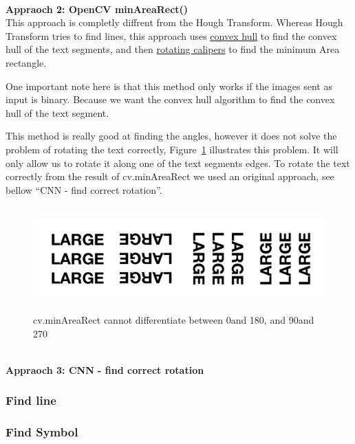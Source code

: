 \documentclass[11pt,a4paper,UKenglish]{article}
\begin{document}
\noindent \\ \textbf{Appraoch 2: OpenCV minAreaRect()}
\noindent \\ This approach is completly diffrent from the Hough Transform.
Whereas Hough Transform tries to find lines, this approach uses
\href{https://en.wikipedia.org/wiki/Convex_hull}{convex hull} to find the
convex hull of the text segments, and then
\href{https://en.wikipedia.org/wiki/Rotating_calipers}{rotating calipers} to
find the minimum Area rectangle. \par
One important note here is that this method only works if the images sent as
input is binary. Because we want the convex hull algorithm to find the convex
hull of the text segment. \par
This method is really good at finding the angles, however it does not solve the
problem of rotating the text correctly, Figure~\ref{fig:4angle_rot} illustrates
this problem. It will only allow us to rotate it along one of the text
segments edges. To rotate the text correctly from the result of cv.minAreaRect
we used an original approach, see bellow ``CNN - find correct rotation''.

\begin{figure}[H]
  \centering
  \includegraphics[height=4cm]{res/4angle_rot.png}
  \caption{cv.minAreaRect cannot differentiate between 0\textdegree and 180\textdegree, and 90\textdegree and 270\textdegree}
  \label{fig:4angle_rot}
\end{figure}


\noindent \\ \textbf{Appraoch 3: CNN - find correct rotation}
\noindent \\






\subsubsection{Find line}
\subsubsection{Find Symbol}
\end{document}

